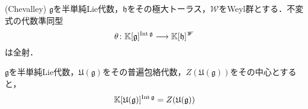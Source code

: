 \documentclass[rep_main]{subfiles}
\begin{document}
\begin{mytheo}[label=thm:Lie-poly-func-ring]{(Chevalley)}
	$\mathfrak{g}$を半単純Lie代数，$\mathfrak{h}$をその極大トーラス，$\mathscr{W}$をWeyl群とする．不変式の代数準同型
	\begin{equation}
		\theta\colon \mathbb{K}[\mathfrak{g}]^{\operatorname{Int}\mathfrak{g}} \longrightarrow \mathbb{K}[\mathfrak{h}]^\mathscr{W}
	\end{equation}
	は全射．
\end{mytheo}
\begin{mytheo}[label=thm:]{}
	$\mathfrak{g}$を半単純Lie代数，$\mathfrak{U}(\mathfrak{g})$をその普遍包絡代数，$Z(\mathfrak{U}(\mathfrak{g}))$をその中心とすると，
	\begin{equation}
		\mathbb{K}[\mathfrak{U}(\mathfrak{g})]^{\operatorname{Int}\mathfrak{g}} = Z(\mathfrak{U}(\mathfrak{g}))
	\end{equation}
\end{mytheo}
\end{document}
